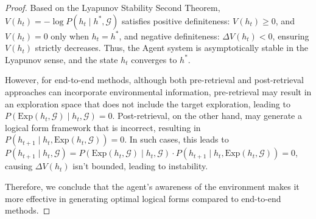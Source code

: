 \documentclass{article}
\theoremstyle{plain}
\theoremstyle{definition}
\theoremstyle{remark}
\begin{document}
\begin{proof}
Based on the Lyapunov Stability Second Theorem, $V(h_t) = -\log P(h_t \mid h^*, \mathcal{G})$ satisfies positive definiteness: $V(h_t) \geq 0$, and $V(h_t) = 0$ only when $h_t = h^*$, and negative definiteness: $\Delta V(h_t) < 0$, ensuring $V(h_t)$ strictly decreases. Thus, the Agent system is asymptotically stable in the Lyapunov sense, and the state $h_t$ converges to $h^*$.

However, for end-to-end methods, although both pre-retrieval and post-retrieval approaches can incorporate environmental information, pre-retrieval may result in an exploration space that does not include the target exploration, leading to $P(\text{Exp}(h_t, \mathcal{G}) \mid h_t, \mathcal{G}) = 0$. Post-retrieval, on the other hand, may generate a logical form framework that is incorrect, resulting in $P(h_{t+1} \mid h_t, \text{Exp}(h_t, \mathcal{G})) = 0$. In such cases, this leads to $P(h_{t+1} \mid h_t, \mathcal{G}) = P(\text{Exp}(h_t, \mathcal{G}) \mid h_t, \mathcal{G}) \cdot P(h_{t+1} \mid h_t, \text{Exp}(h_t, \mathcal{G})) = 0$, causing $\Delta V(h_t)$ isn't bounded, leading to instability. 

Therefore, we conclude that the agent’s awareness of the environment makes it more effective in generating optimal logical forms compared to end-to-end methods.

\end{proof}
\end{document}
